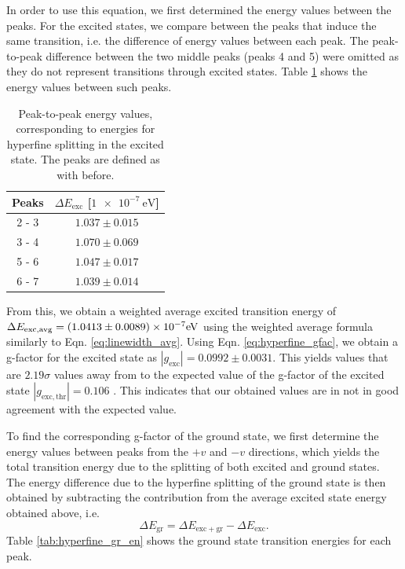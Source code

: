 \documentclass[a4paper]{report}
\numberwithin{equation}{section}
\begin{document}
In order to use this equation, we first determined the energy values between the peaks. For the excited states, we compare between the 
peaks that induce the same transition, i.e. the difference of energy values between each peak. The peak-to-peak difference between the 
two middle peaks (peaks 4 and 5) were omitted as they do not represent transitions through excited states. Table \ref{tab:hyperfine_exc_en} shows the energy values between such peaks.  

\begin{table}[!ht]
    \centering
    \begin{tabular}{|c|c|}
    \hline
        Peaks & $\Delta E_\mathrm{exc}$ [$\SI{1e-7}{\electronvolt}$] \\ \hline
        2 - 3 & $1.037 \pm 0.015$ \\ \hline
        3 - 4 & $1.070 \pm 0.069$\\ \hline
        5 - 6 & $1.047 \pm 0.017$ \\ \hline
        6 - 7 & $1.039 \pm 0.014$ \\ \hline
    \end{tabular}
    \caption{Peak-to-peak energy values, corresponding to energies for hyperfine splitting in the excited state. The peaks are 
    defined as with before.}
    \label{tab:hyperfine_exc_en}
\end{table}

From this, we obtain a weighted average excited transition energy of $\Delta E_\mathrm{exc, avg} = (1.0413 \pm 0.0089)\times 10^{-7} \si[]{\electronvolt}$ 
using the weighted average formula similarly to Eqn. \ref{eq:linewidth_avg}. Using Eqn. \ref{eq:hyperfine_gfac}, we obtain a g-factor for the excited state as $| g_\mathrm{exc} | = 0.0992 \pm 0.0031$.
This yields values that are $2.19\sigma$ values away from to the expected value of 
the g-factor of the excited state $| g_\mathrm{exc, thr} | = 0.106$ \cite{VANIN2007}. This indicates that our obtained 
values are in not in good agreement with the expected value.\par 

To find the corresponding g-factor of the ground state, we first determine the energy values between peaks from the $+v$ and $-v$
directions, which yields the total transition energy due to the 
splitting of both excited and ground states. The energy difference due to the hyperfine splitting of the ground state is then obtained by 
subtracting the contribution from the average excited state energy obtained above, i.e.
\begin{equation}
    \Delta E_{\mathrm{gr}} = \Delta E_{\mathrm{exc + gr}} - \Delta E_{\mathrm{exc}} . 
\end{equation}
Table \ref{tab:hyperfine_gr_en} shows the ground state transition energies for each peak. 
\end{document}
